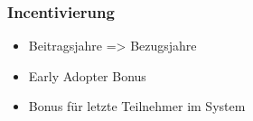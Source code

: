 \subsubsection{Incentivierung}

\begin{itemize}
\item Beitragsjahre => Bezugsjahre
\item Early Adopter Bonus
\item Bonus für letzte Teilnehmer im System
\end{itemize}